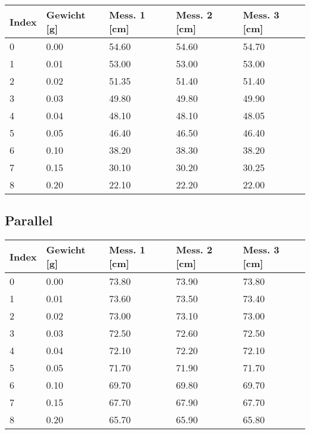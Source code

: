 \documentclass[../main.tex]{subfiles} %
\begin{document}
    \begin{center}
        \begin{tabular}{ |l|l|l|l|l| } \hline\rowcolor{Gray!50}
            Index & Gewicht [g] & Mess. 1 [cm] & Mess. 2 [cm] & Mess. 3 [cm] \\\toprule\hline
            0     & 0.00        & 54.60        & 54.60        & 54.70        \\\hline
            1     & 0.01        & 53.00        & 53.00        & 53.00        \\\hline
            2     & 0.02        & 51.35        & 51.40        & 51.40        \\\hline
            3     & 0.03        & 49.80        & 49.80        & 49.90        \\\hline
            4     & 0.04        & 48.10        & 48.10        & 48.05        \\\hline
            5     & 0.05        & 46.40        & 46.50        & 46.40        \\\hline
            6     & 0.10        & 38.20        & 38.30        & 38.20        \\\hline
            7     & 0.15        & 30.10        & 30.20        & 30.25        \\\hline
            8     & 0.20        & 22.10        & 22.20        & 22.00        \\\hline
        \end{tabular}
    \end{center}

    \subsection{Parallel}\label{subsec:parallel}

    \begin{center}
        \begin{tabular}{ |l|l|l|l|l| } \hline\rowcolor{Gray!50}
            Index & Gewicht [g] & Mess. 1 [cm] & Mess. 2 [cm] & Mess. 3 [cm] \\\toprule\hline
            0     & 0.00        & 73.80        & 73.90        & 73.80        \\\hline
            1     & 0.01        & 73.60        & 73.50        & 73.40        \\\hline
            2     & 0.02        & 73.00        & 73.10        & 73.00        \\\hline
            3     & 0.03        & 72.50        & 72.60        & 72.50        \\\hline
            4     & 0.04        & 72.10        & 72.20        & 72.10        \\\hline
            5     & 0.05        & 71.70        & 71.90        & 71.70        \\\hline
            6     & 0.10        & 69.70        & 69.80        & 69.70        \\\hline
            7     & 0.15        & 67.70        & 67.90        & 67.70        \\\hline
            8     & 0.20        & 65.70        & 65.90        & 65.80        \\\hline
        \end{tabular}
    \end{center}
\end{document}
